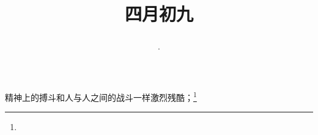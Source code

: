 \title{\date[d=16,m=5,y=2024][year:cn-y,年,month:cn,day:cn,日,·,weekday]·四月初九 }
精神上的搏斗和人与人之间的战斗一样激烈残酷；\footnote{ }

